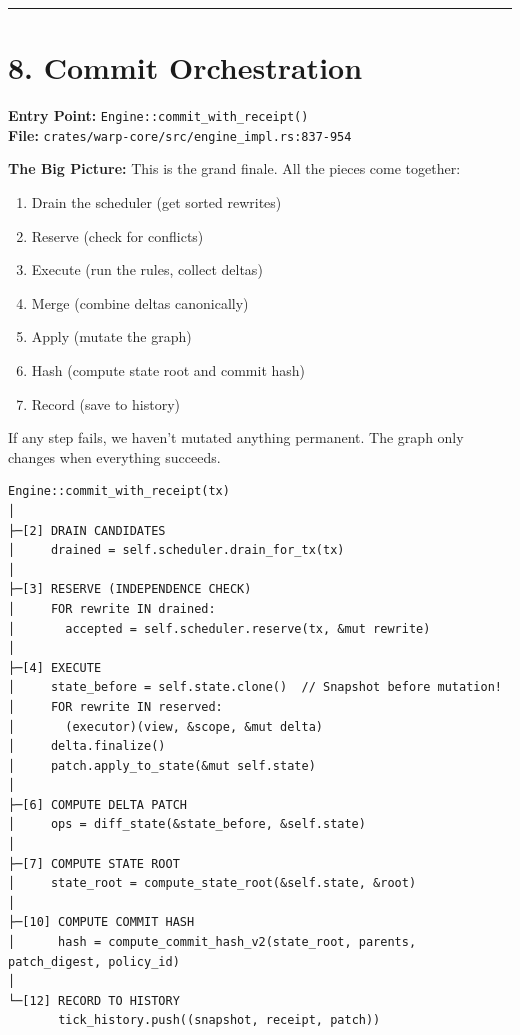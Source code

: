 \documentclass[11pt]{book}
\newenvironment{bigpicture}
{\begin{mdframed}[
  linecolor=purple!60,
  linewidth=2pt,
  leftline=true,
  rightline=false,
  topline=false,
  bottomline=false,
  backgroundcolor=purple!3,
  innerleftmargin=12pt,
  innerrightmargin=10pt,
  innertopmargin=8pt,
  innerbottommargin=8pt,
  skipabove=12pt,
  skipbelow=12pt
]\small\sffamily\color{purple!70!black}\textbf{The Big Picture:} }
{\end{mdframed}}
\begin{document}
\begin{center}\rule{0.5\linewidth}{0.5pt}\end{center}

\section{8. Commit Orchestration}\label{commit-orchestration}

\textbf{Entry Point:} \texttt{Engine::commit\_with\_receipt()} \\
\textbf{File:} \texttt{crates/warp-core/src/engine\_impl.rs:837-954}

\begin{bigpicture}
This is the grand finale. All the pieces come together:

\begin{enumerate}
\item Drain the scheduler (get sorted rewrites)
\item Reserve (check for conflicts)
\item Execute (run the rules, collect deltas)
\item Merge (combine deltas canonically)
\item Apply (mutate the graph)
\item Hash (compute state root and commit hash)
\item Record (save to history)
\end{enumerate}

If any step fails, we haven't mutated anything permanent. The graph only changes when everything succeeds.
\end{bigpicture}

\begin{verbatim}
Engine::commit_with_receipt(tx)
│
├─[2] DRAIN CANDIDATES
│     drained = self.scheduler.drain_for_tx(tx)
│
├─[3] RESERVE (INDEPENDENCE CHECK)
│     FOR rewrite IN drained:
│       accepted = self.scheduler.reserve(tx, &mut rewrite)
│
├─[4] EXECUTE
│     state_before = self.state.clone()  // Snapshot before mutation!
│     FOR rewrite IN reserved:
│       (executor)(view, &scope, &mut delta)
│     delta.finalize()
│     patch.apply_to_state(&mut self.state)
│
├─[6] COMPUTE DELTA PATCH
│     ops = diff_state(&state_before, &self.state)
│
├─[7] COMPUTE STATE ROOT
│     state_root = compute_state_root(&self.state, &root)
│
├─[10] COMPUTE COMMIT HASH
│      hash = compute_commit_hash_v2(state_root, parents, patch_digest, policy_id)
│
└─[12] RECORD TO HISTORY
       tick_history.push((snapshot, receipt, patch))
\end{verbatim}
\end{document}
